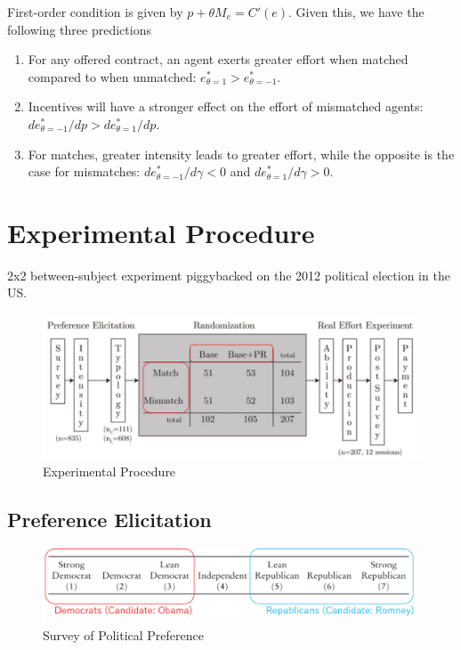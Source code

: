 \documentclass[../root]{subfiles}
\begin{document}
    First-order condition is given by $p + \theta M_e = C'(e)$.
    Given this, we have the following three predictions
    \begin{enumerate}
        \item For any offered contract, an agent exerts greater effort when matched compared to when unmatched: $e^*_{\theta = 1} > e^*_{\theta = -1}$.
        \item Incentives will have a stronger effect on the effort of mismatched agents: $de^*_{\theta = -1}/dp > de^*_{\theta = 1}/dp$.
        \item For matches, greater intensity leads to greater effort, while the opposite is the case for mismatches: $de^*_{\theta = -1}/d\gamma < 0$ and $de^*_{\theta = 1}/d\gamma > 0$.
    \end{enumerate}


    \section{Experimental Procedure}

    2x2 between-subject experiment piggybacked on the 2012 political election in the US.
    
    \begin{figure}[h]
        \centering
        \includegraphics[width = 1.0\linewidth]{os0602kato/exp_proceed.PNG}
        \caption{Experimental Procedure}
        \label{Procedure}
    \end{figure}

    \subsection{Preference Elicitation}

    \begin{figure}[h]
        \centering
        \includegraphics[width = 1.0\linewidth]{os0602kato/poli_preference.PNG}
        \caption{Survey of Political Preference}
        \label{Preference}
    \end{figure}
  
\end{document}
